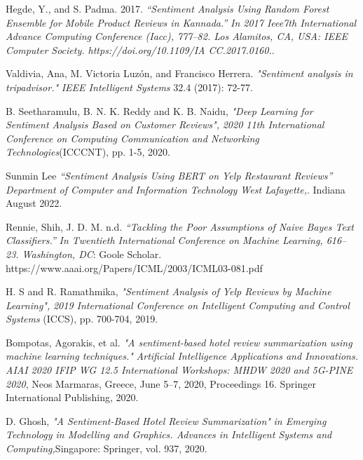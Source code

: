 \documentclass[a4paper, 12pt]{report}
\begin{document}
\begin{thebibliography}{9}
Hegde, Y., and S. Padma. 2017. 
\textit{“Sentiment Analysis Using Random Forest Ensemble for Mobile Product Reviews in Kannada.”}
\textit{In 2017                      Ieee7th International Advance Computing Conference (Iacc), 777–82. Los Alamitos, CA, USA: IEEE Computer Society. https://doi.org/10.1109/IA CC.2017.0160.}. 

Valdivia, Ana, M. Victoria Luzón, and Francisco Herrera. 
\textit{"Sentiment analysis in tripadvisor."}
\textit{IEEE Intelligent Systems} 32.4 (2017): 72-77.

B. Seetharamulu, B. N. K. Reddy and K. B. Naidu, 
\textit{"Deep Learning for Sentiment Analysis Based on 
	Customer Reviews",}
\textit{2020 11th International Conference on Computing Communication and 
	Networking Technologies}(ICCCNT), pp. 1-5, 2020. 

Sunmin Lee 
\textit{“Sentiment Analysis Using BERT on Yelp Restaurant Reviews”}
\textit{Department of Computer and Information Technology West Lafayette,}. 
Indiana August 2022.

Rennie, Shih, J. D. M. n.d.  
\textit{“Tackling the Poor Assumptions of Naive Bayes Text Classifiers.”}
\textit{In Twentieth International Conference on Machine Learning, 616–23. Washington, DC}: Goole Scholar. https://www.aaai.org/Papers/ICML/2003/ICML03-081.pdf

H. S and R. Ramathmika, 
\textit{"Sentiment Analysis of Yelp Reviews by Machine Learning",}
\textit{ 2019 International Conference on Intelligent Computing and Control Systems} (ICCS), pp. 700-704, 2019.

Bompotas, Agorakis, et al.  
\textit{"A sentiment-based hotel review summarization using machine learning techniques."}
\textit{Artificial Intelligence Applications and Innovations. AIAI 2020 IFIP WG 12.5 International Workshops: MHDW 2020 and 5G-PINE 2020}, Neos Marmaras, Greece, June 5–7, 2020, Proceedings 16. Springer International Publishing, 2020.

D. Ghosh,   
\textit{"A Sentiment-Based Hotel Review Summarization"}
\textit{in Emerging Technology in Modelling and 
	Graphics. Advances in Intelligent Systems and Computing,}Singapore: Springer, vol. 937, 2020.


\end{thebibliography}
\end{document}
